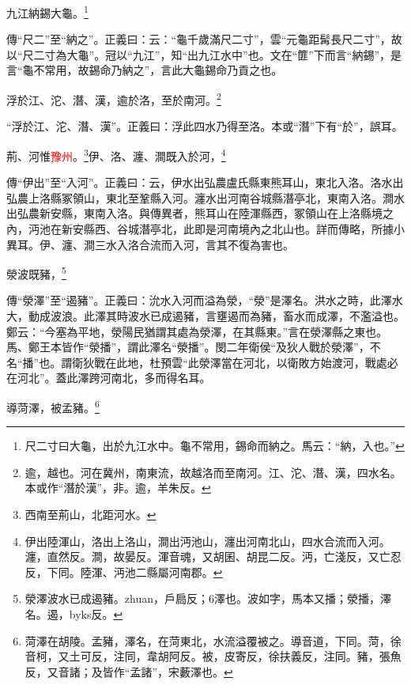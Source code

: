 九江納錫大龜。\footnote{尺二寸曰大龜，出於九江水中。龜不常用，錫命而納之。馬云：“納，入也。”}

{\noindent\zhuan{}\fzbyks 傳“尺二”至“納之”。正義曰：云：“龜千歲滿尺二寸”，雲“元龜距髯長尺二寸”，故以“尺二寸為大龜”。冠以“九江”，知“出九江水中”也。文在“篚”下而言“納錫”，是言“龜不常用，故錫命乃納之”，言此大龜錫命乃貢之也。 \par}

浮於江、沱、潛、漢，逾於洛，至於南河。\footnote{逾，越也。河在冀州，南東流，故越洛而至南河。江、沱、潛、漢，四水名。本或作“潛於漢”，非。逾，羊朱反。}

{\noindent\shu{}\fzkt “浮於江、沱、潛、漢”。正義曰：浮此四水乃得至洛。本或“潛”下有“於”，誤耳。 \par}

荊、河惟\textcolor{red}{豫州}。\footnote{西南至荊山，北距河水。}伊、洛、瀍、澗既入於河，\footnote{伊出陸渾山，洛出上洛山，澗出沔池山，瀍出河南北山，四水合流而入河。瀍，直然反。澗，故晏反。渾音魂，又胡囷、胡昆二反。沔，亡淺反，又亡忍反，下同。陸渾、沔池二縣屬河南郡。}

{\noindent\zhuan{}\fzbyks 傳“伊出”至“入河”。正義曰：云，伊水出弘農盧氏縣東熊耳山，東北入洛。洛水出弘農上洛縣冢領山，東北至鞏縣入河。瀍水出河南谷城縣潛亭北，東南入洛。澗水出弘農新安縣，東南入洛。與傳異者，熊耳山在陸渾縣西，冢領山在上洛縣境之內，沔池在新安縣西、谷城潛亭北，此即是河南境內之北山也。詳而傳略，所據小異耳。伊、瀍、澗三水入洛合流而入河，言其不復為害也。 \par}

滎波既豬，\footnote{滎澤波水已成遏豬。zhuan，戶扃反；6澤也。波如字，馬本又播；滎播，澤名。遏，byks反。}

{\noindent\shu{}\fzkt 傳“滎澤”至“遏豬”。正義曰：沇水入河而溢為滎，“滎”是澤名。洪水之時，此澤水大，動成波浪。此澤其時波水已成遏豬，言壅遏而為豬，畜水而成澤，不濫溢也。鄭云：“今塞為平地，滎陽民猶謂其處為滎澤，在其縣東。”言在滎澤縣之東也。馬、鄭王本皆作“滎播”，謂此澤名“滎播”。閔二年衛侯“及狄人戰於滎澤”，不名“播”也。謂衛狄戰在此地，杜預雲“此滎澤當在河北，以衛敗方始渡河，戰處必在河北”。蓋此澤跨河南北，多而得名耳。 \par}

導菏澤，被孟豬。\footnote{菏澤在胡陵。孟豬，澤名，在菏東北，水流溢覆被之。導音道，下同。菏，徐音柯，又土可反，注同，韋胡阿反。被，皮寄反，徐扶義反，注同。豬，張魚反，又音諸；及皆作“孟諸”，宋藪澤也。}

